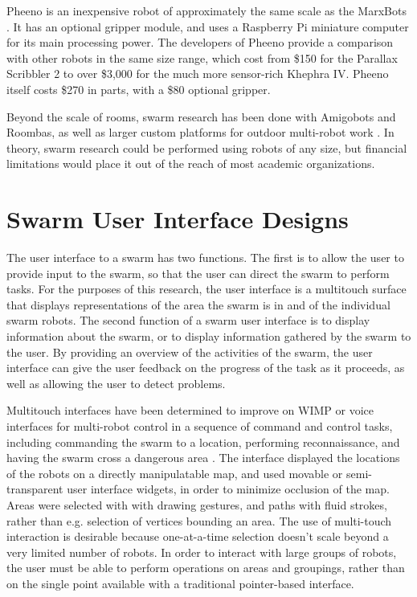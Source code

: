 Pheeno is an inexpensive robot of approximately the same scale as the MarxBots \citep{wilson2016pheeno}.
It has an optional gripper module, and uses a Raspberry Pi miniature computer for its main processing power. 
The developers of Pheeno provide a comparison with other robots in the same size range, which cost from \$150 for the Parallax Scribbler 2 to over \$3,000 for the much more sensor-rich Khephra IV. 
Pheeno itself costs \$270 in parts, with a \$80 optional gripper. 

Beyond the scale of rooms, swarm research has been done with Amigobots and Roombas, as well as larger custom platforms for outdoor multi-robot work \citep{guo2007bio, tammet2008rfid, olson2013cacm}.
In theory, swarm research could be performed using robots of any size, but financial limitations would place it out of the reach of most academic organizations. 


\section{Swarm User Interface Designs} \label{section:Swarm_User_Interface_Designs}

The user interface to a swarm has two functions. 
The first is to allow the user to provide input to the swarm, so that the user can direct the swarm to perform tasks. 
For the purposes of this research, the user interface is a multitouch surface that displays representations of the area the swarm is in and of the individual swarm robots. 
The second function of a swarm user interface is to display information about the swarm, or to display information gathered by the swarm to the user. 
By providing an overview of the activities of the swarm, the user interface can give the user feedback on the progress of the task as it proceeds, as well as allowing the user to detect problems. 

Multitouch interfaces have been determined to improve on WIMP or voice interfaces for multi-robot control in a sequence of command and control tasks, including commanding the swarm to a location, performing reconnaissance, and having the swarm cross a dangerous area \citep{hayes2010multi}.
The interface displayed the locations of the robots on a directly manipulatable map, and used movable or semi-transparent user interface widgets, in order to minimize occlusion of the map. 
Areas were selected with with drawing gestures, and paths with fluid strokes, rather than e.g. selection of vertices bounding an area.
The use of multi-touch interaction is desirable because one-at-a-time selection doesn't scale beyond a very limited number of robots.
In order to interact with large groups of robots, the user must be able to perform operations on areas and groupings, rather than on the single point available with a traditional pointer-based interface. 

